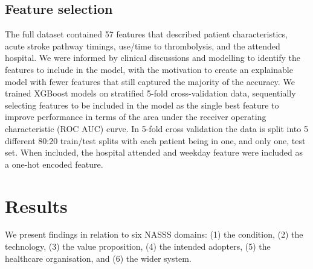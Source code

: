 \subsection{Feature selection}

The full dataset contained 57 features that described patient characteristics, acute stroke pathway timings, use/time to thrombolysis, and the attended hospital. We were informed by clinical discussions and modelling to identify the features to include in the model, with the motivation to create an explainable model with fewer features that still captured the majority of the accuracy. We trained XGBoost models on stratified 5-fold cross-validation data, sequentially selecting features to be included in the model as the single best feature to improve performance in terms of the area under the receiver operating characteristic (ROC AUC) curve. In 5-fold cross validation the data is split into 5 different 80:20 train/test splits with each patient being in one, and only one, test set. When included, the hospital attended and weekday feature were included as a one-hot encoded feature.

\section{Results}

We present findings in relation to six NASSS domains: (1) the condition, (2) the technology, (3) the value proposition, (4) the intended adopters, (5) the healthcare organisation, and (6) the wider system.

